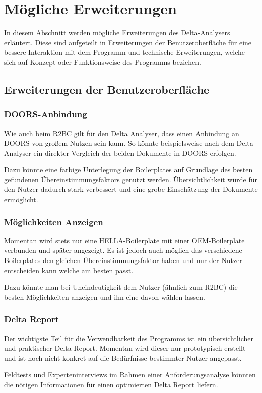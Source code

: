 \documentclass[12pt]{report}
\begin{document}
\section{Mögliche Erweiterungen}
In diesem Abschnitt werden mögliche Erweiterungen des Delta-Analysers erläutert. Diese sind aufgeteilt in Erweiterungen der Benutzeroberfläche für eine bessere Interaktion mit dem Programm und technische Erweiterungen, welche sich auf Konzept oder Funktionsweise des Programms beziehen.
\subsection[Benutzeroberfläche]{Erweiterungen der Benutzeroberfläche}
\subsubsection{DOORS-Anbindung}
Wie auch beim R2BC gilt für den Delta Analyser, dass einen Anbindung an DOORS von großem Nutzen sein kann. So könnte beispielsweise nach dem Delta Analyser ein direkter Vergleich der beiden Dokumente in DOORS erfolgen.

Dazu könnte eine farbige Unterlegung der Boilerplates auf Grundlage des besten gefundenen Übereinstimmungsfaktors genutzt werden. Übersichtlichkeit würde für den Nutzer dadurch stark verbessert und eine grobe Einschätzung der Dokumente ermöglicht.
\subsubsection{Möglichkeiten Anzeigen}
Momentan wird stets nur eine HELLA-Boilerplate mit einer OEM-Boilerplate verbunden und später angezeigt. Es ist jedoch auch möglich das verschiedene Boilerplates den gleichen Übereinstimmungsfaktor haben und nur der Nutzer entscheiden kann welche am besten passt.

Dazu könnte man bei Uneindeutigkeit dem Nutzer (ähnlich zum R2BC) die besten Möglichkeiten anzeigen und ihn eine davon wählen lassen.
\subsubsection{Delta Report}
Der wichtigste Teil für die Verwendbarkeit des Programms ist ein übersichtlicher und praktischer Delta Report. Momentan  wird dieser nur prototypisch erstellt und ist noch nicht konkret auf die Bedürfnisse bestimmter Nutzer angepasst.

Feldtests und Experteninterviews im Rahmen einer Anforderungsanalyse könnten die nötigen Informationen für einen optimierten Delta Report liefern.
\end{document}
